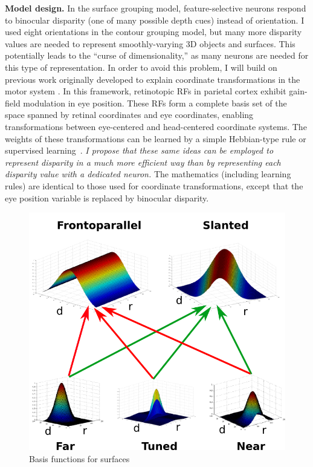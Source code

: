 \documentclass[11pt]{article}
\begin{document}
\textbf{Model design.} In the surface grouping model,
feature-selective neurons respond to binocular disparity (one of many
possible depth cues) instead of orientation.  I used eight
orientations in the contour grouping model, but many more disparity
values are needed to represent smoothly-varying 3D objects and
surfaces. This potentially leads to the ``curse of dimensionality,''
as many neurons are needed for this type of representation. In order
to avoid this problem, I will build on previous work originally
developed to explain coordinate transformations in the motor system
\citep{Salinas_Abbott95, Pouget_Sejnowski97b}. In this framework,
retinotopic RFs in parietal cortex exhibit gain-field modulation in
eye position. These RFs form a complete basis set of the space spanned
by retinal coordinates and eye coordinates, enabling transformations
between eye-centered and head-centered coordinate systems. The weights
of these transformations can be learned by a simple Hebbian-type rule
or supervised learning~\citep{Salinas_Abbott95}. {\em I propose that
  these same ideas can be employed to represent disparity in a much
  more efficient way than by representing each disparity value with a
  dedicated neuron.} The mathematics (including learning rules) are
identical to those used for coordinate transformations, except that
the eye position variable is replaced by binocular disparity.

\begin{figure}
  \vspace{-20pt}
  \centering 
  \includegraphics[width=.4\textwidth]{figs/basisfunc}
  \caption{Basis functions for surfaces} 
  \vspace{-15pt}
  \label{fig:BasisFunctions}
\end{figure}
\end{document}
